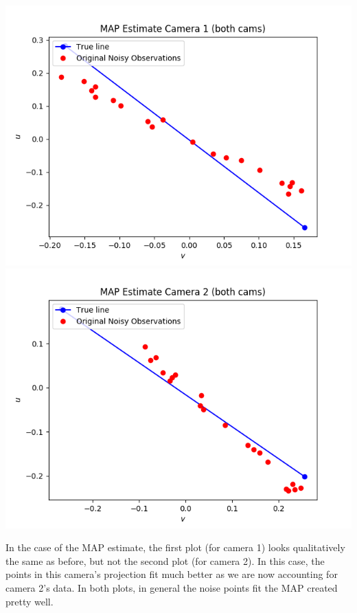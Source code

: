 \documentclass[10pt]{article}
\begin{document}
\begin{enumerate}
\includegraphics{figures/map_cam1_both_cams.png}
\includegraphics{figures/map_cam2_both_cams.png}

In the case of the MAP estimate, the first plot (for camera 1) looks qualitatively the same as before, but not the second plot (for camera 2). In this case, the points in this camera's projection fit much better as we are now accounting for camera 2's data. In both plots, in general the noise points fit the MAP created pretty well.

\end{enumerate}
\end{document}
